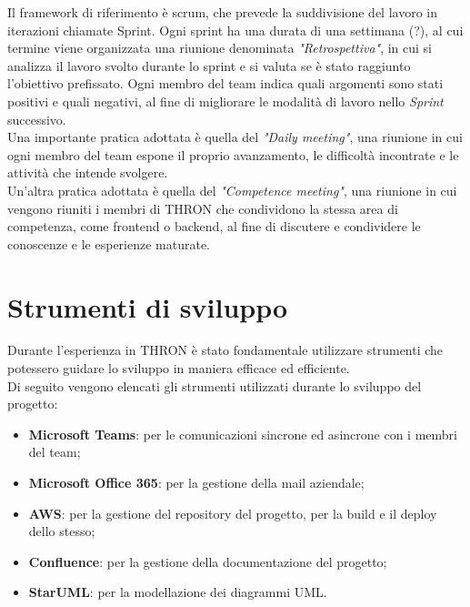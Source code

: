 Il \glsfirstoccur\gls{framework} di riferimento è \glsfirstoccur\gls{scrum}, che prevede la suddivisione del
lavoro in iterazioni chiamate \glsfirstoccur\gls{Sprint}. Ogni sprint ha una durata di una
settimana (?), al cui termine viene organizzata una riunione denominata
\emph{"Retrospettiva"}, in cui si analizza il lavoro svolto durante lo sprint
e si valuta se è stato raggiunto l'obiettivo prefissato. Ogni
membro del team indica quali argomenti sono stati positivi e quali
negativi, al fine di migliorare le modalità di lavoro nello
\emph{Sprint} successivo.\\
Una importante pratica adottata è quella del \emph{"Daily
    meeting"}, una riunione in cui ogni membro del team espone il proprio
avanzamento, le difficoltà incontrate e le attività che intende svolgere. \\
Un'altra pratica adottata è quella del \emph{"Competence meeting"}, una riunione
in cui vengono riuniti i membri di THRON che condividono la stessa area di
competenza, come \glsfirstoccur\gls{frontend} o \glsfirstoccur\gls{backend}, al
fine di discutere e condividere le conoscenze e le esperienze maturate.\\

\section{Strumenti di sviluppo}
Durante l'esperienza in THRON è stato fondamentale utilizzare strumenti che
potessero guidare lo sviluppo in maniera efficace ed efficiente.\\
Di seguito vengono elencati gli strumenti utilizzati durante lo sviluppo del
progetto:
\begin{itemize}
    \item \textbf{Microsoft Teams}: per le comunicazioni sincrone ed asincrone
          con i membri del team;
    \item \textbf{Microsoft Office 365}: per la gestione della mail aziendale;
    \item \textbf{AWS}: per la gestione del \glsfirstoccur\gls{repository} del
          progetto, per la \glsfirstoccur\gls{build} e il \glsfirstoccur\gls{deploy}
          dello stesso;
    \item \textbf{Confluence}: per la gestione della documentazione del progetto;
    \item \textbf{StarUML}: per la modellazione dei diagrammi \glsfirstoccur\gls{UML}.
\end{itemize}

